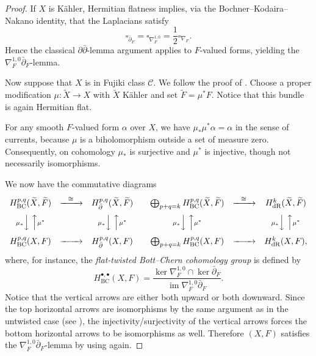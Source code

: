 \documentclass[11pt]{amsart}
\newcommand{\bp}{\bar{\partial}}
\numberwithin{equation}{section}
\theoremstyle{definition}
\theoremstyle{plain}
\theoremstyle{plain}
\theoremstyle{definition}
\theoremstyle{stepstyle}
\begin{document}
	\begin{proof}
		If $X$ is K\"ahler, Hermitian flatness  implies, via the Bochner--Kodaira--Nakano identity, that the Laplacians satisfy
		\[
		\square_{\bar\partial_F} = \square_{\nabla^{1,0}_F} = \frac{1}{2}\square_{\nabla_F}.
		\] Hence the classical $\partial\bar\partial$-lemma argument applies to $F$-valued forms, yielding the $\nabla_F^{1,0}\bar\partial_F$-lemma.
		
		\medskip
		Now suppose that $X$ is in Fujiki class $\mathcal C$. We follow the proof of  \cite[$\S$VI, Theorem 12.9]{Deme}. Choose a proper modification $\mu:\widetilde X\to X$ with $\tilde X$ K\"ahler and set $\widetilde F=\mu^*F$. Notice that  this bundle is again Hermitian flat. 
		
		For any smooth $F$-valued form $\alpha$ over $X$, we have $\mu_*\mu^*\alpha = \alpha$ in the sense of  currents, because $\mu$ is a biholomorphism outside a set of measure zero. Consequently, on cohomology $\mu_*$ is surjective and $\mu^*$ is injective, though not necessarily isomorphisms. 
		
		We now have the commutative diagrams
		\[
		\renewcommand{\arraystretch}{1.5}
		\begin{array}{ccc}
			H_{\mathrm{BC}}^{p,q}(\widetilde X,\widetilde F) & \xrightarrow{\;\;\,\,\cong\,\,\;\;} & H^{p,q}_{\bp}(\widetilde X,\widetilde F) \\[1ex]
			{\scriptstyle\mu_*}\Big\downarrow\;\Big\uparrow{\scriptstyle\mu^*} & & {\scriptstyle\mu_*}\Big\downarrow\;\Big\uparrow{\scriptstyle\mu^*} \\[1ex]
			H_{\mathrm{BC}}^{p,q}(X,F) & \xrightarrow{\;\;\quad\,\;\;} & H^{p,q}_{\bp}(X,F)
		\end{array}
		\quad
		\begin{array}{ccc}
			\bigoplus_{p+q=k} H_{\mathrm{BC}}^{p,q}(\widetilde X,\widetilde F) & \xrightarrow{\;\;\,\,\cong\,\,\;\;}  & H_{\mathrm{dR}}^k(\widetilde X,\widetilde F) \\[1ex]
			{\scriptstyle\mu_*}\Big\downarrow\;\Big\uparrow{\scriptstyle\mu^*} & & {\scriptstyle\mu_*}\Big\downarrow\;\Big\uparrow{\scriptstyle\mu^*} \\[1ex]
			\bigoplus_{p+q=k} H_{\mathrm{BC}}^{p,q}(X,F)& \xrightarrow{\;\;\quad\,\;\;} & H_{\mathrm{dR}}^k(X,F),
		\end{array}
		\]	where, for instance, the \textit{flat-twisted Bott--Chern cohomology group} is defined by
		\[
		H_{\mathrm{BC}}^{\bullet,\bullet}(X,F) = \frac{\ker \nabla^{1,0}_F \cap \ker\bar\partial_F}{\operatorname{im} \nabla_F^{1,0}\bar\partial_F}.
		\]
		Notice that the vertical arrows are either both upward or both
		downward. Since the top horizontal arrows are isomorphisms by
		the same argument as in the untwisted case
		(see \cite[Lemma 5.15 \&  Remark 5.16]{DGMS75}),
		the injectivity/surjectivity of the vertical arrows forces the
		bottom horizontal arrows to be isomorphisms as well.   Therefore
		$(X,F)$ satisfies the $\nabla_F^{1,0}\bar\partial_F$-lemma by using \cite{DGMS75} again.
	\end{proof}
	
\end{document}
